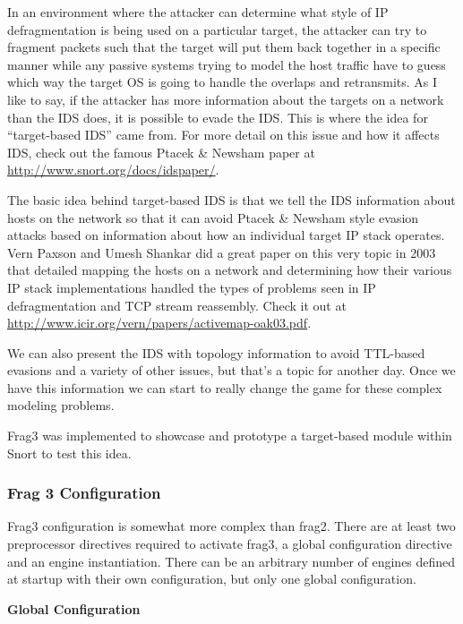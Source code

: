 \documentclass[english]{report}
\begin{document}
In an environment where the attacker can determine what style of IP
defragmentation is being used on a particular target, the attacker can try to
fragment packets such that the target will put them back together in a specific
manner while any passive systems trying to model the host traffic have to guess
which way the target OS is going to handle the overlaps and retransmits.  As I
like to say, if the attacker has more information about the targets on a
network than the IDS does, it is possible to evade the IDS.  This is where the
idea for ``target-based IDS'' came from.  For more detail on this issue and how
it affects IDS, check out the famous Ptacek \& Newsham paper at
\url{http://www.snort.org/docs/idspaper/}.

The basic idea behind target-based IDS is that we tell the IDS information
about hosts on the network so that it can avoid Ptacek \& Newsham style evasion
attacks based on information about how an individual target IP stack operates.
Vern Paxson and Umesh Shankar did a great paper on this very topic in 2003 that
detailed mapping the hosts on a network and determining how their various IP
stack implementations handled the types of problems seen in IP defragmentation
and TCP stream reassembly.  Check it out at
\url{http://www.icir.org/vern/papers/activemap-oak03.pdf}.

We can also present the IDS with topology information to avoid TTL-based
evasions and a variety of other issues, but that's a topic for another day.
Once we have this information we can start to really change the game for these
complex modeling problems.

Frag3 was implemented to showcase and prototype a target-based module within
Snort to test this idea.

\subsubsection{Frag 3 Configuration}

Frag3 configuration is somewhat more complex than frag2.  There are at least
two preprocessor directives required to activate frag3, a global configuration
directive and an engine instantiation.  There can be an arbitrary number of
engines defined at startup with their own configuration, but only one global
configuration.

\textbf{Global Configuration}
\end{document}
